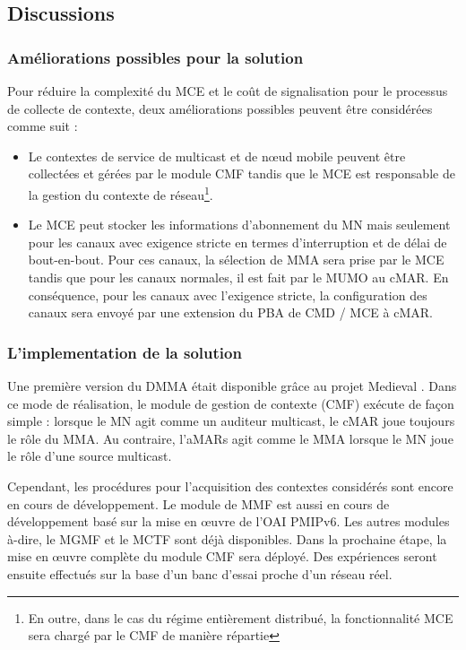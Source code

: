 \subsection{Discussions}\label{c10:discussion}
\subsubsection{Améliorations possibles pour la solution }
Pour réduire la complexité du MCE et le coût de signalisation pour le processus de collecte de contexte, deux améliorations possibles peuvent être considérées comme suit :
\begin{itemize}
\item Le contextes de service de multicast et de nœud mobile peuvent être collectées et gérées par le module CMF tandis que le MCE est responsable de la gestion du contexte de réseau\footnote{En outre, dans le cas du régime entièrement distribué, la fonctionnalité MCE sera chargé par le CMF de manière répartie}. 
\item Le MCE peut stocker les informations d'abonnement du MN mais seulement pour les canaux avec exigence stricte en termes d'interruption et de délai de bout-en-bout. Pour ces canaux, la sélection de MMA sera prise par le MCE tandis que pour les canaux normales, il est fait par le MUMO au cMAR. En conséquence, pour les canaux avec l'exigence stricte, la configuration des canaux sera envoyé par une extension du PBA de  CMD / MCE à cMAR.
\end{itemize} 

\subsubsection{L'implementation de la solution}
Une première version du DMMA était disponible grâce au projet Medieval \cite{d4.4, d6.4, ICC_Sergio}. Dans ce mode de réalisation, le module de gestion de contexte (CMF) exécute de façon simple : lorsque le MN agit comme un auditeur multicast, le cMAR joue toujours le rôle du MMA. Au contraire, l'aMARs agit comme le MMA lorsque le MN joue le rôle d'une source multicast. 

Cependant, les procédures pour l'acquisition des contextes considérés sont encore en cours de développement. Le module de MMF est aussi en cours de développement basé sur la mise en œuvre de l'OAI PMIPv6. Les autres modules à-dire, le MGMF et le MCTF sont déjà disponibles. Dans la prochaine étape, la mise en œuvre complète du module CMF sera déployé. Des expériences seront ensuite effectués sur la base d'un banc d'essai proche d’un réseau réel.
 

